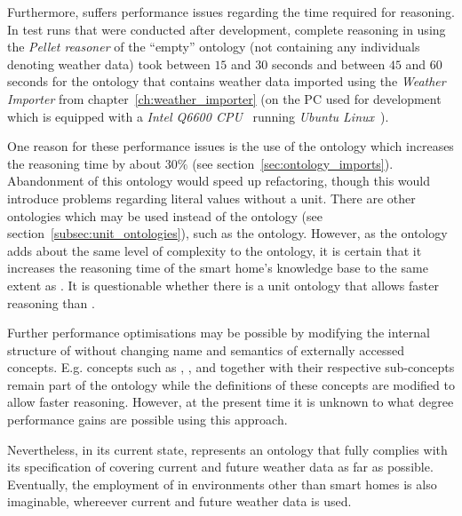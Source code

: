 Furthermore, \smarthomeweather suffers performance issues regarding the time required for reasoning. In test runs that were conducted after development, complete reasoning in \protege using the \emph{Pellet reasoner} of the ``empty'' ontology (not containing any individuals denoting weather data) took between $15$ and $30$ seconds and between $45$ and $60$ seconds for the ontology that contains weather data imported using the \emph{Weather Importer} from chapter~\ref{ch:weather_importer} (on the PC used for development which is equipped with a \emph{Intel Q6600 CPU}~\cite{intel_q6600} running \emph{Ubuntu Linux}~\cite{ubuntu}).

One reason for these performance issues is the use of the \muo ontology which increases the reasoning time by about $30 \%$ (see section~\ref{sec:ontology_imports}). Abandonment of this ontology would speed up refactoring, though this would introduce problems regarding literal values without a unit. There are other ontologies which may be used instead of the \muo ontology (see section~\ref{subsec:unit_ontologies}), such as the  ontology. However, as the  ontology adds about the same level of complexity to the ontology, it is certain that it increases the reasoning time of the smart home's knowledge base to the same extent as \muo. It is questionable whether there is a unit ontology that allows faster reasoning than \muo.

Further performance optimisations may be possible by modifying the internal structure of \smarthomeweather without changing name and semantics of externally accessed concepts. E.g. concepts such as , , and  together with their respective sub-concepts remain part of the ontology while the definitions of these concepts are modified to allow faster reasoning. However, at the present time it is unknown to what degree performance gains are possible using this approach.

Nevertheless, in its current state, \smarthomeweather represents an ontology that fully complies with its specification of covering current and future weather data as far as possible. Eventually, the employment of \smarthomeweather in environments other than smart homes is also imaginable, whereever current and future weather data is used.
